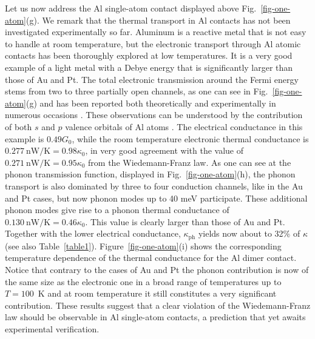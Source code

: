 \documentclass[aps,amsmath,amssymb,twocolumn,showpacs]{revtex4-1}
\begin{document}
Let us now address the Al single-atom contact displayed above
Fig.~\ref{fig-one-atom}(g). We remark that the thermal transport in Al
contacts has not been investigated experimentally so far. Aluminum is a
reactive metal that is not easy to handle at room temperature, but the
electronic transport through Al atomic contacts has been thoroughly explored
at low temperatures. It is a very good example of a light metal with a Debye
energy that is significantly larger than those of Au and Pt. The total
electronic transmission around the Fermi energy stems from two to three
partially open channels, as one can see in Fig.~\ref{fig-one-atom}(g) and has
been reported both theoretically and experimentally in numerous occasions
\cite{Scheer1997,Scheer1998,Cuevas1998a,Cuevas1998b,Jelinek2003,Schirm2013}. These
observations can be understood by the contribution of both $s$ and $p$ valence
orbitals of Al atoms \cite{Scheer1998,Cuevas1998a}. The electrical conductance
in this example is $0.49G_0$, while the room temperature electronic thermal
conductance is $0.277~\text{nW/K}=0.98\kappa_0$, in very good agreement with
the value of $0.271~\text{nW/K}=0.95\kappa_0$ from the Wiedemann-Franz law. As
one can see at the phonon transmission function, displayed in
Fig.~\ref{fig-one-atom}(h), the phonon transport is also dominated by three to
four conduction channels, like in the Au and Pt cases, but now
phonon modes up to 40 meV participate. These additional phonon modes give
rise to a phonon thermal conductance of $0.130~\text{nW/K}=0.46\kappa_0$. This
value is clearly larger than those of Au and Pt. Together with the lower
electrical conductance, $\kappa_{\text{ph}}$ yields now about to 32\% of
$\kappa$ (see also Table~\ref{table1}). Figure~\ref{fig-one-atom}(i) shows the
corresponding temperature dependence of the thermal conductance for the Al
dimer contact. Notice that contrary to the cases of Au and Pt the phonon
contribution is now of the same size as the electronic one in a broad range of
temperatures up to $T=100$~K and at room temperature it still constitutes a
very significant contribution. These results suggest that a clear violation of
the Wiedemann-Franz law should be observable in Al single-atom contacts, a
prediction that yet awaits experimental verification.
\end{document}
